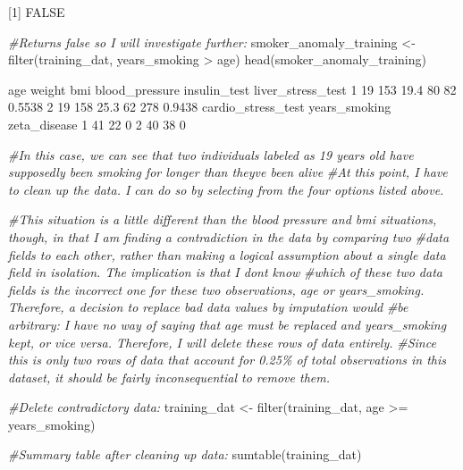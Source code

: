 \documentclass[
]{article}
\newenvironment{Shaded}{\begin{snugshade}}{\end{snugshade}}
\newcommand{\CommentTok}[1]{\textcolor[rgb]{0.56,0.35,0.01}{\textit{#1}}}
\newcommand{\FunctionTok}[1]{\textcolor[rgb]{0.00,0.00,0.00}{#1}}
\newcommand{\NormalTok}[1]{#1}
\newcommand{\OtherTok}[1]{\textcolor[rgb]{0.56,0.35,0.01}{#1}}
\newcommand{\SpecialCharTok}[1]{\textcolor[rgb]{0.00,0.00,0.00}{#1}}
\begin{document}
{[}1{]} FALSE

\begin{Shaded}
\begin{Highlighting}[]
\CommentTok{\#Returns false so I will investigate further:}
\NormalTok{smoker\_anomaly\_training }\OtherTok{\textless{}{-}} \FunctionTok{filter}\NormalTok{(training\_dat, years\_smoking }\SpecialCharTok{\textgreater{}}\NormalTok{ age)}
\FunctionTok{head}\NormalTok{(smoker\_anomaly\_training)}
\end{Highlighting}
\end{Shaded}

age weight bmi blood\_pressure insulin\_test liver\_stress\_test 1 19
153 19.4 80 82 0.5538 2 19 158 25.3 62 278 0.9438 cardio\_stress\_test
years\_smoking zeta\_disease 1 41 22 0 2 40 38 0

\begin{Shaded}
\begin{Highlighting}[]
\CommentTok{\#In this case, we can see that two individuals labeled as 19 years old have supposedly been smoking for longer than they\textquotesingle{}ve been alive}
\CommentTok{\#At this point, I have to clean up the data. I can do so by selecting from the four options listed above. }

\CommentTok{\#This situation is a little different than the blood pressure and bmi situations, though, in that I am finding a contradiction in the data by comparing two}
\CommentTok{\#data fields to each other, rather than making a logical assumption about a single data field in isolation. The implication is that I don\textquotesingle{}t know }
\CommentTok{\#which of these two data fields is the incorrect one for these two observations, age or years\_smoking. Therefore, a decision to replace bad data values by imputation would}
\CommentTok{\#be arbitrary: I have no way of saying that age must be replaced and years\_smoking kept, or vice versa. Therefore, I will delete these rows of data entirely. }
\CommentTok{\#Since this is only two rows of data that account for 0.25\% of total observations in this dataset, it should be fairly inconsequential to remove them.}

\CommentTok{\#Delete contradictory data:}
\NormalTok{training\_dat }\OtherTok{\textless{}{-}} \FunctionTok{filter}\NormalTok{(training\_dat, age }\SpecialCharTok{\textgreater{}=}\NormalTok{ years\_smoking)}


\CommentTok{\#Summary table after cleaning up data:}
\FunctionTok{sumtable}\NormalTok{(training\_dat)}
\end{Highlighting}
\end{Shaded}
\end{document}
